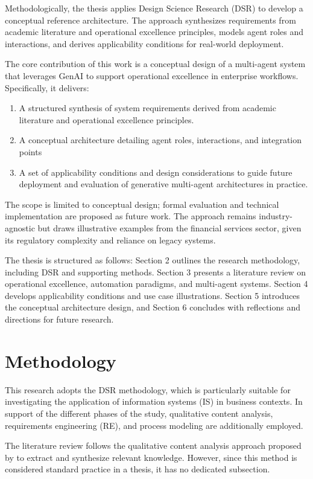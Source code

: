 Methodologically, the thesis applies Design Science Research (DSR) to develop a conceptual reference architecture. The approach synthesizes requirements from academic literature and operational excellence principles, models agent roles and interactions, and derives applicability conditions for real-world deployment.

The core contribution of this work is a conceptual design of a multi-agent system that leverages GenAI to support operational excellence in enterprise workflows. Specifically, it delivers:
\begin{enumerate}
    \item A structured synthesis of system requirements derived from academic literature and operational excellence principles.
    \item A conceptual architecture detailing agent roles, interactions, and integration points
    \item A set of applicability conditions and design considerations to guide future deployment and evaluation of generative multi-agent architectures in practice.
\end{enumerate}

The scope is limited to conceptual design; formal evaluation and technical implementation are proposed as future work. The approach remains industry-agnostic but draws illustrative examples from the financial services sector, given its regulatory complexity and reliance on legacy systems.

The thesis is structured as follows: Section 2 outlines the research methodology, including DSR and supporting methods. Section 3 presents a literature review on operational excellence, automation paradigms, and multi-agent systems. Section 4 develops applicability conditions and use case illustrations. Section 5 introduces the conceptual architecture design, and Section 6 concludes with reflections and directions for future research.

\section{Methodology} \label{2methodology}
This research adopts the DSR methodology, which is particularly suitable for investigating the application of information systems (IS) in business contexts. In support of the different phases of the study, qualitative content analysis, requirements engineering (RE), and process modeling are additionally employed.

The literature review follows the qualitative content analysis approach proposed by \textcite{mayringQualitativeContentAnalysis2022} to extract and synthesize relevant knowledge. However, since this method is considered standard practice in a thesis, it has no dedicated subsection.

